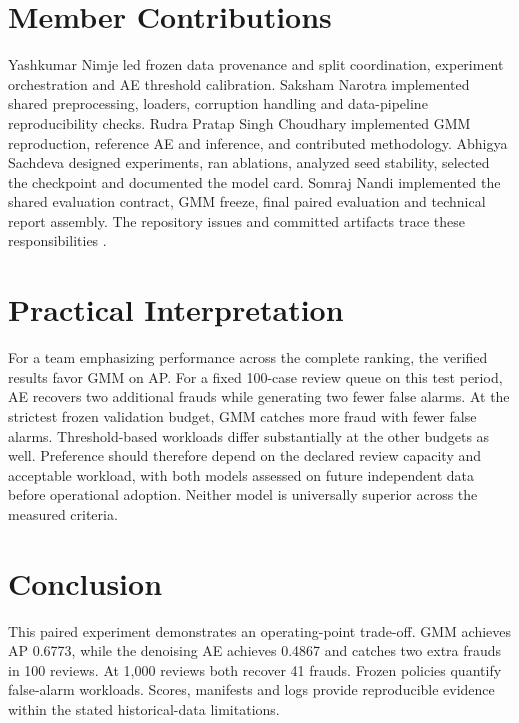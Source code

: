 \documentclass[conference]{IEEEtran}
\begin{document}
\section{Member Contributions}
Yashkumar Nimje led frozen data provenance and split coordination, experiment orchestration and AE threshold calibration. Saksham Narotra implemented shared preprocessing, loaders, corruption handling and data-pipeline reproducibility checks. Rudra Pratap Singh Choudhary implemented GMM reproduction, reference AE and inference, and contributed methodology. Abhigya Sachdeva designed experiments, ran ablations, analyzed seed stability, selected the checkpoint and documented the model card. Somraj Nandi implemented the shared evaluation contract, GMM freeze, final paired evaluation and technical report assembly. The repository issues and committed artifacts trace these responsibilities \cite{repo}.

\section{Practical Interpretation}
For a team emphasizing performance across the complete ranking, the verified results favor GMM on AP. For a fixed 100-case review queue on this test period, AE recovers two additional frauds while generating two fewer false alarms. At the strictest frozen validation budget, GMM catches more fraud with fewer false alarms. Threshold-based workloads differ substantially at the other budgets as well. Preference should therefore depend on the declared review capacity and acceptable workload, with both models assessed on future independent data before operational adoption. Neither model is universally superior across the measured criteria.

\section{Conclusion}
This paired experiment demonstrates an operating-point trade-off. GMM achieves AP 0.6773, while the denoising AE achieves 0.4867 and catches two extra frauds in 100 reviews. At 1,000 reviews both recover 41 frauds. Frozen policies quantify false-alarm workloads. Scores, manifests and logs provide reproducible evidence within the stated historical-data limitations.
\end{document}
